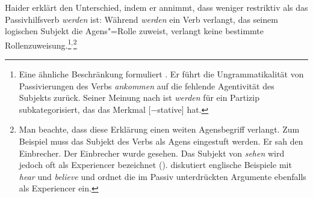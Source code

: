 %
Haider erklärt den Unterschied, indem er annimmt, dass \sein 
weniger restriktiv als das Passivhilfsverb \emph{werden} ist: Während \emph{werden} ein
Verb verlangt, das seinem logischen Subjekt die Agens"=Rolle
zuweist, verlangt \sein keine bestimmte Rollenzuweisung.\footnote{
        Eine ähnliche Beschränkung formuliert \citet[, ]{Toman86a}. Er führt
        die Ungrammatikalität von Passivierungen des Verbs \emph{ankommen} auf
        die fehlende Agentivität des Subjekts zurück. Seiner Meinung nach ist 
        \emph{werden} für ein Partizip subkategorisiert, das das Merkmal [$-$stative] hat.%
}$^,$\footnote{
        Man beachte, dass diese Erklärung einen weiten Agensbegriff verlangt. Zum Beispiel
        muss das Subjekt des Verbs  als Agens eingestuft werden.
        \eal
        \ex Er sah den Einbrecher.
        \ex Der Einbrecher wurde gesehen.
        \zl
        Das Subjekt von \emph{sehen} wird jedoch oft als Experiencer bezeichnet (\zb \citealp[]{Devlin92}). \citet[]{Dowty2000a} diskutiert englische
        Beispiele mit \emph{hear} und \emph{believe} und ordnet die im Passiv unterdrückten
        Argumente ebenfalls als Experiencer ein.%


}
